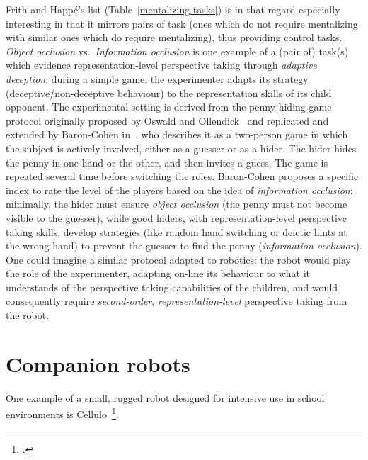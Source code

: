 \documentclass[11pt,a4paper]{report}
\begin{document}
Frith and Happé's list (Table~\ref{mentalizing-tasks}) is in that regard
especially interesting in that it mirrors pairs of task (ones which do not
require mentalizing with similar ones which do require mentalizing), thus
providing control tasks.  \emph{Object occlusion} vs.~\emph{Information
occlusion} is one example of a (pair of) task(s) which evidence
representation-level perspective taking through \emph{adaptive deception}:
during a simple game, the experimenter adapts its strategy
(deceptive/non-deceptive behaviour) to the representation skills of its child
opponent. The experimental setting is derived from the penny-hiding game
protocol originally proposed by Oswald and Ollendick~\cite{oswald1989role} and
replicated and extended by Baron-Cohen in~\cite{baron1992out}, who describes it
as a two-person game in which the subject is actively involved, either as a
guesser or as a hider. The hider hides the penny in one hand or the other, and
then invites a guess. The game is repeated several time before switching the
roles. Baron-Cohen proposes a specific index to rate the level of the players
based on the idea of \emph{information occlusion}: minimally, the hider must
ensure \emph{object occlusion} (the penny must not become visible to the
guesser), while good hiders, with representation-level perspective taking
skills, develop strategies (like random hand switching or deictic hints at the
wrong hand) to prevent the guesser to find the penny (\emph{information
occlusion}). One could imagine a similar protocol adapted to robotics: the robot
would play the role of the experimenter, adapting on-line its
behaviour to what it understands of the perspective taking capabilities of the
children, and would consequently require \emph{second-order},
\emph{representation-level} perspective taking from the robot.




\section{Companion robots}

One example of a small, rugged robot designed for intensive use in school
environments is Cellulo~\footcite{ozgur2017cellulo}.
\end{document}
